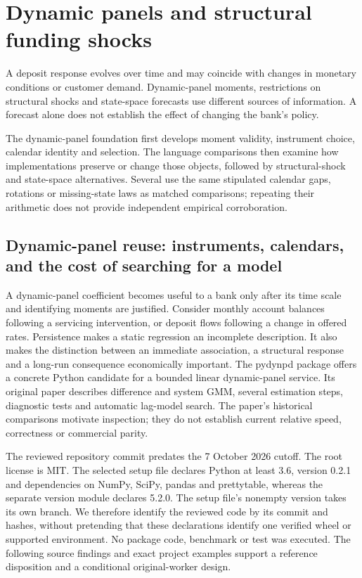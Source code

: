 \chapter{Dynamic panels and structural funding shocks}
A deposit response evolves over time and may coincide with changes in
monetary conditions or customer demand. Dynamic-panel moments, restrictions
on structural shocks and state-space forecasts use different sources of
information. A forecast alone does not establish the effect of changing the
bank's policy.

The dynamic-panel foundation first develops moment validity, instrument choice,
calendar identity and selection. The language comparisons then examine how
implementations preserve or change those objects, followed by structural-shock
and state-space alternatives. Several use the same stipulated calendar gaps,
rotations or missing-state laws as matched comparisons; repeating their
arithmetic does not provide independent empirical corroboration.



\section{Dynamic-panel reuse: instruments, calendars, and the cost of searching for a model}
\label{sec:exec24-pydynpd}

A dynamic-panel coefficient becomes useful to a bank only after its time scale and identifying moments are justified.
Consider monthly account balances following a servicing intervention, or deposit flows
following a change in offered rates. Persistence makes a static regression an incomplete
description. It also makes the distinction between an immediate association, a structural
response and a long-run consequence economically important. The pydynpd package offers
a concrete Python candidate for a bounded linear dynamic-panel service. Its original paper
describes difference and system GMM, several estimation steps, diagnostic tests and automatic
lag-model search. The paper's historical comparisons motivate inspection; they do not establish
current relative speed, correctness or commercial parity.~\citep{exec24_pydynpd_paper}

The reviewed repository commit predates the 7 October 2026 cutoff. The root license is MIT.
The selected setup file declares Python at least 3.6, version 0.2.1 and dependencies on NumPy,
SciPy, pandas and prettytable, whereas the separate version module declares 5.2.0. The setup
file's nonempty version takes its own branch. We therefore identify the reviewed code by its
commit and hashes, without pretending that these declarations identify one verified wheel or
supported environment. No package code, benchmark or test was executed. The following
source findings and exact project examples support a reference disposition and a conditional
original-worker design.~\citep{exec24_pydynpd_source}

